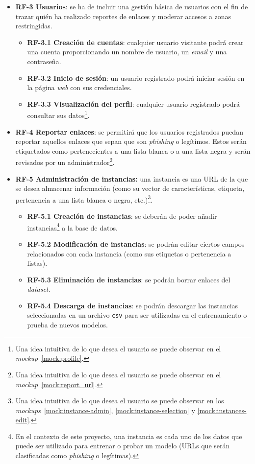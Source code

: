 \begin{itemize}
	\item \textbf{RF-3 Usuarios}: se ha de incluir una gestión básica de usuarios con el fin de trazar quién ha realizado reportes de enlaces y moderar accesos a zonas restringidas.
	\begin{itemize}
	\item \textbf{RF-3.1 Creación de cuentas}: cualquier usuario visitante podrá crear una cuenta proporcionando un nombre de usuario, un \textit{email} y una contraseña.
	\item \textbf{RF-3.2 Inicio de sesión}: un usuario registrado podrá iniciar sesión en la página \textit{web} con sus credenciales.
	\item \textbf{RF-3.3 Visualización del perfil}: cualquier usuario registrado podrá consultar sus datos\footnote{Una idea intuitiva de lo que desea el usuario se puede observar en el \textit{mockup}~\ref{mock:profile}.}.
	\end{itemize}

	\item \textbf{RF-4 Reportar enlaces}: se permitirá que los usuarios registrados puedan reportar aquellos enlaces que sepan que son \textit{phishing} o legítimos. Estos serán etiquetados como pertenecientes a una lista blanca o a una lista negra y serán revisados por un administrador\footnote{Una idea intuitiva de lo que desea el usuario se puede observar en el \textit{mockup}~\ref{mock:report_url}.}.
	
	\item \textbf{RF-5 Administración de instancias:} una instancia es una URL de la que se desea almacenar información (como su vector de características, etiqueta, pertenencia a una lista blanca o negra, etc.)\footnote{Una idea intuitiva de lo que desea el usuario se puede observar en los \textit{mockups}~\ref{mock:instance-admin}, \ref{mock:instance-selection} y \ref{mock:instances-edit}.}.
	\begin{itemize}
		\item \textbf{RF-5.1 Creación de instancias}: se deberán de poder añadir instancias\footnote{En el contexto de este proyecto, una instancia es cada uno de los datos que puede ser utilizado para entrenar o probar un modelo (URLs que serán clasificadas como \textit{phishing} o legítimas).}  a la base de datos.
		\item \textbf{RF-5.2 Modificación de instancias}: se podrán editar ciertos campos relacionados con cada instancia (como sus etiquetas o pertenencia a listas).
		\item \textbf{RF-5.3 Eliminación de instancias}: se podrán borrar enlaces del \textit{dataset}.
		\item \textbf{RF-5.4 Descarga de instancias}: se podrán descargar las instancias seleccionadas en un archivo \texttt{csv} para ser utilizadas en el entrenamiento o prueba de nuevos modelos.
	\end{itemize}
	

\end{itemize}
